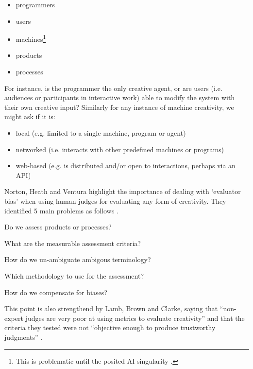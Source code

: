 \begin{itemize}
  \item programmers
  \item users
  \item machines\footnote{This is problematic until the posited \ac{AI} singularity \autocite{Schmidhuber2006a}.}
  \item products
  \item processes
\end{itemize}

For instance, is the programmer the only creative agent, or are users (i.e. audiences or participants in interactive work) able to modify the system with their own creative input? Similarly for any instance of machine creativity, we might ask if it is:

\begin{itemize}
  \item local (e.g. limited to a single machine, program or agent)
  \item networked (i.e. interacts with other predefined machines or programs)
  \item web-based (e.g. is distributed and/or open to interactions, perhaps via an API)
\end{itemize}

Norton, Heath and Ventura highlight the importance of dealing with `evaluator bias' when using human judges for evaluating any form of creativity. They identified 5 main problems as follows \autocite*{Norton2015}. 

\begin{description}[leftmargin=3.5cm]
  \item[$1^{st}$ problem] Do we assess products or processes?
  \item[$2^{nd}$ problem] What are the measurable assessment criteria?
  \item[$3^{rd}$ problem] How do we un-ambiguate ambigous terminology?
  \item[$4^{th}$ problem] Which methodology to use for the assessment?
  \item[$5^{th}$ problem] How do we compensate for biases?
\end{description}

This point is also strengthend by Lamb, Brown and Clarke, saying that ``non-expert judges are very poor at using metrics to evaluate creativity'' and that the criteria they tested were not ``objective enough to produce trustworthy judgments'' \autocite*{Lamb2015}.


